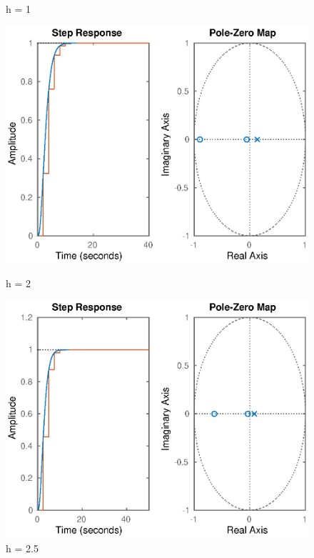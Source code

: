 \begin{figure}[!h]
\begin{minipage}[b]{0.5\linewidth}
    \caption{h = 1} 
    \vspace{4ex}
  \end{minipage} 
  \begin{minipage}[b]{0.5\linewidth}
    \centering
    \includegraphics[width=1\linewidth]{eps/labo1-ordre3-2} 
    \caption{h = 2} 
    \vspace{4ex}
  \end{minipage}%
  \begin{minipage}[b]{0.5\linewidth}
    \centering
    \includegraphics[width=1\linewidth]{eps/labo1-ordre3-2-5} 
    \caption{h = 2.5} 
    \vspace{4ex}
  \end{minipage} 
\end{figure}
